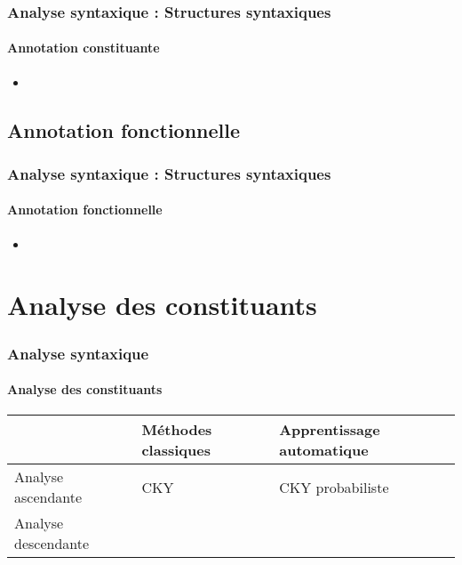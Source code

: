 \documentclass[xcolor=table]{beamer}
\begin{document}
\begin{frame}
\frametitle{Analyse syntaxique : Structures syntaxiques}
\framesubtitle{Annotation constituante}

\begin{itemize}
	\item 
\end{itemize}

\end{frame}

\subsection{Annotation fonctionnelle}

\begin{frame}
\frametitle{Analyse syntaxique : Structures syntaxiques}
\framesubtitle{Annotation fonctionnelle}

\begin{itemize}
	\item 
\end{itemize}

\end{frame}

\section{Analyse des constituants}

\begin{frame}
\frametitle{Analyse syntaxique}
\framesubtitle{Analyse des constituants}


\begin{tabular}{|p{}|p{}|p{}|}
	\hline
	& Méthodes classiques & Apprentissage automatique \\
	\hline
	Analyse ascendante & CKY & CKY probabiliste\\
	\hline
	Analyse descendante &  & \\
	\hline
\end{tabular}

\end{frame}
\end{document}
